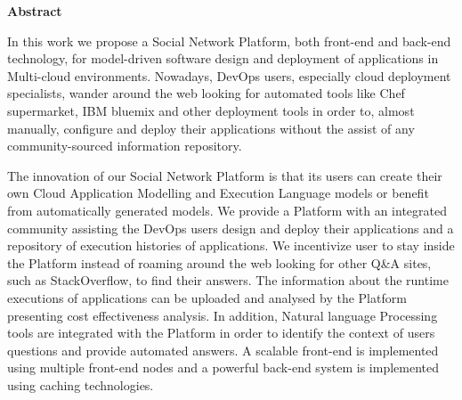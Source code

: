 \thispagestyle{empty}
\begin{titlepage}
\begin{center}
{\bf\Large Abstract}\\
\end{center}

\indent In this work we propose a Social Network Platform, both front-end and back-end technology, for model-driven software design and deployment of applications in Multi-cloud environments. Nowadays, DevOps users, especially cloud deployment specialists, wander around the web looking for automated tools like Chef supermarket, IBM bluemix and other deployment tools in order to, almost manually, configure and deploy their applications without the assist of any community-sourced information repository. 

The innovation of our Social Network Platform is that its users can create their own Cloud Application Modelling and Execution
Language models or benefit from automatically generated models. We provide a Platform with an integrated community assisting the DevOps users design and deploy their applications and a repository of execution histories of applications. We incentivize user to stay inside the Platform instead of roaming around the web looking for other Q\&A sites, such as StackOverflow, to find their answers. The information about the runtime executions of applications can be uploaded and analysed by the Platform presenting cost effectiveness analysis. In addition, Natural language Processing tools are integrated with the Platform in order to identify the context of users questions and provide automated answers. A scalable front-end is implemented using multiple front-end nodes and a powerful back-end system is implemented using caching technologies. 


\vfill
\end{titlepage}

